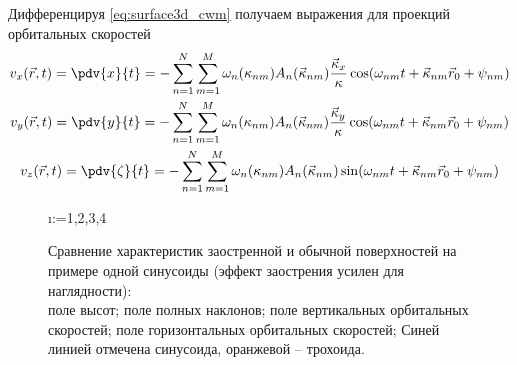 Дифференцируя \eqref{eq:surface3d_cwm} получаем выражения для
проекций орбитальных
скоростей 
\begin{equation}
    \begin{gathered}
        \label{eq:orbital_velocity}
        v_x(\vec r, t)  = \pdv{x}{t} = - \fullsum \omega_n(\kappa_{nm}) A_n(\vec
        \kappa_{nm}) \frac{\vec \kappa_x}{\kappa} \cos(\fullphase) \\
        v_y (\vec r, t) = \pdv{y}{t} = - \fullsum \omega_n(\kappa_{nm}) A_n(\vec
        \kappa_{nm}) \frac{\vec \kappa_y}{\kappa}\cos(\fullphase) \\
        v_z (\vec r, t) = \pdv{\zeta}{t} = - \fullsum \omega_n(\kappa_{nm})
        A_n(\vec \kappa_{nm})
        \sin(\fullphase)
    \end{gathered}
\end{equation}




\begin{figure}[h]
\centering
\makeatletter
    \@for\i:={1,2,3,4}

\label{fig:cwm_demo}
\caption{
    Сравнение характеристик заостренной и обычной поверхностей на примере одной
    синусоиды (эффект заострения усилен для наглядности): \\
     поле высот;
     поле полных наклонов;
     поле вертикальных орбитальных скоростей;
     поле горизонтальных орбитальных скоростей;
    Синей линией отмечена синусоида, оранжевой -- трохоида.
}
\makeatother
\end{figure}




